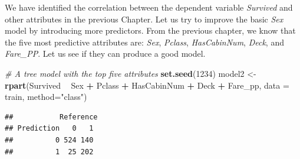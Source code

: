 \documentclass[
]{book}
\newenvironment{Shaded}{\begin{snugshade}}{\end{snugshade}}
\newcommand{\CommentTok}[1]{\textcolor[rgb]{0.56,0.35,0.01}{\textit{#1}}}
\newcommand{\DataTypeTok}[1]{\textcolor[rgb]{0.13,0.29,0.53}{#1}}
\newcommand{\DecValTok}[1]{\textcolor[rgb]{0.00,0.00,0.81}{#1}}
\newcommand{\KeywordTok}[1]{\textcolor[rgb]{0.13,0.29,0.53}{\textbf{#1}}}
\newcommand{\NormalTok}[1]{#1}
\newcommand{\OperatorTok}[1]{\textcolor[rgb]{0.81,0.36,0.00}{\textbf{#1}}}
\newcommand{\StringTok}[1]{\textcolor[rgb]{0.31,0.60,0.02}{#1}}
\begin{document}
We have identified the correlation between the dependent variable \emph{Survived} and other attributes in the previous Chapter. Let us try to improve the basic \emph{Sex} model by introducing more predictors. From the previous chapter, we know that the five most predictive attributes are: \emph{Sex}, \emph{Pclass}, \emph{HasCabinNum}, \emph{Deck}, and \emph{Fare\_PP}. Let us see if they can produce a good model.

\begin{Shaded}
\begin{Highlighting}[]
\CommentTok{# A tree model with the top five attributes }
\KeywordTok{set.seed}\NormalTok{(}\DecValTok{1234}\NormalTok{)}
\NormalTok{model2 <-}\StringTok{ }\KeywordTok{rpart}\NormalTok{(Survived }\OperatorTok{~}\StringTok{ }\NormalTok{Sex }\OperatorTok{+}\StringTok{ }\NormalTok{Pclass }\OperatorTok{+}\StringTok{ }\NormalTok{HasCabinNum }\OperatorTok{+}\StringTok{ }\NormalTok{Deck }\OperatorTok{+}\StringTok{ }\NormalTok{Fare_pp, }\DataTypeTok{data =}\NormalTok{ train, }\DataTypeTok{method=}\StringTok{"class"}\NormalTok{)}
\end{Highlighting}
\end{Shaded}

\begin{Shaded}
\end{Shaded}

\begin{verbatim}
##           Reference
## Prediction   0   1
##          0 524 140
##          1  25 202
\end{verbatim}

\begin{Shaded}
\end{Shaded}
\end{document}
